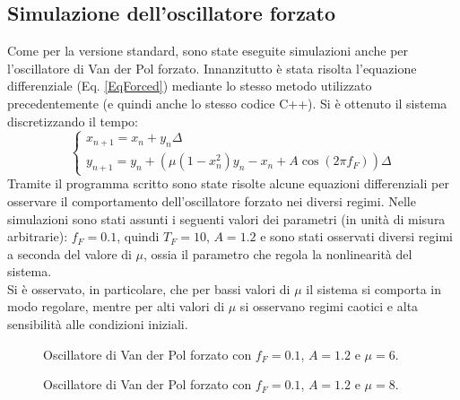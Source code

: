 \documentclass[12pt]{article}
\begin{document}
\subsection{Simulazione dell'oscillatore forzato}
Come per la versione standard, sono state eseguite simulazioni anche per l'oscillatore di Van der Pol forzato. Innanzitutto è stata risolta l'equazione differenziale (Eq. \ref{EqForced}) mediante lo stesso metodo utilizzato precedentemente (e quindi anche lo stesso codice C++).
Si è ottenuto il sistema discretizzando il tempo:
\begin{equation}
	\begin{cases}
		x_{n+1} = x_n + y_n\Delta \\
		y_{n+1} = y_n + \left( \mu(1-x_n^2)y_n-x_n+A\cos(2\pi f_F)\right) \Delta
	\end{cases}
\end{equation}
Tramite il programma scritto sono state risolte alcune equazioni differenziali per osservare il comportamento dell'oscillatore forzato nei diversi regimi.
Nelle simulazioni sono stati assunti i seguenti valori dei parametri (in unità di misura arbitrarie): $f_F = 0.1$, quindi $T_F = 10$, $A = 1.2$ e sono stati osservati diversi regimi a seconda del valore di $\mu$, ossia il parametro che regola la nonlinearità del sistema. \\
Si è osservato, in particolare, che per bassi valori di $\mu$ il sistema si comporta in modo regolare, mentre per alti valori di $\mu$ si osservano regimi caotici e alta sensibilità alle condizioni iniziali.
\begin{figure}[H]
	\centering
	
	\caption{Oscillatore di Van der Pol forzato con $f_F = 0.1$, $A = 1.2$ e $\mu = 6$.}
	\label{VDPF6}
\end{figure}
\begin{figure}[H]
	\centering
	
	\caption{Oscillatore di Van der Pol forzato con $f_F = 0.1$, $A = 1.2$ e $\mu = 8$.}
	\label{VDPF8}
\end{figure}
\begin{figure}[H]
	\centering
	
\end{figure}
\end{document}
